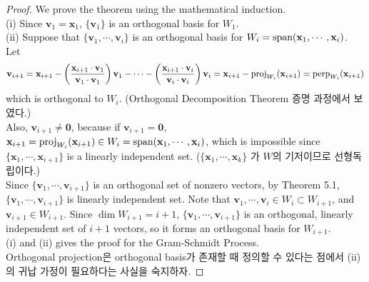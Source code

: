 \begin{proof}
	We prove the theorem using the mathematical induction. \\
	
	(i) Since $\textbf{v}_1 = \textbf{x}_1$, $\{\textbf{v}_1 \}$ is an orthogonal basis for $W_1$. \\
	
	(ii) Suppose that $\{\textbf{v}_1, \cdots, \textbf{v}_i \}$ is an orthogonal basis for $W_i = \textnormal{span}(\textbf{x}_1, \cdots, \textbf{x}_i)$.  Let \begin{equation*}
	\textbf{v}_{i+1} = \textbf{x}_{i+1} - \left (\frac{\textbf{x}_{i+1} \cdot \textbf{v}_1}{\textbf{v}_1 \cdot \textbf{v}_1} \right )\textbf{v}_1 - \cdots - \left (\frac{\textbf{x}_{i+1} \cdot \textbf{v}_i}{\textbf{v}_i \cdot \textbf{v}_i} \right)\textbf{v}_i = \textbf{x}_{i+1} - \textnormal{proj}_{W_i}(\textbf{x}_{i+1}) = \textnormal{perp}_{W_i}(\textbf{x}_{i+1})
	\end{equation*}
	which is orthogonal to $W_i$. {\color{blue}(Orthogonal Decomposition Theorem 증명 과정에서 보였다.)} \\
	Also, $\textbf{v}_{i+1} \neq \textbf{0}$, because if $\textbf{v}_{i+1} = \textbf{0}$, $\textbf{x}_{i+1} = \textnormal{proj}_{W_i}(\textbf{x}_{i+1}) \in W_i = \textnormal{span}(\textbf{x}_1, \cdots, \textbf{x}_i)$, which is impossible since $\{\textbf{x}_1, \cdots, \textbf{x}_{i+1} \}$ is a linearly independent set. {\color{blue}($\{\textbf{x}_1, \cdots, \textbf{x}_k \}$ 가 $W$의 기저이므로 선형독립이다.)} \\
	
	Since $\{\textbf{v}_1, \cdots, \textbf{v}_{i+1} \}$ is an orthogonal set of nonzero vectors, by Theorem 5.1, $\{\textbf{v}_1, \cdots, \textbf{v}_{i+1} \}$ is linearly independent set. Note that $\textbf{v}_1, \cdots, \textbf{v}_i \in W_i \subset W_{i+1}$, and $\textbf{v}_{i+1} \in W_{i+1}$. Since $\dim{W_{i+1}} = i+1$, $\{\textbf{v}_1, \cdots, \textbf{v}_{i+1} \}$ is an orthogonal, linearly independent set of $i+1$ vectors, so it forms an orthogonal basis for $W_{i+1}$. \\
	
	(i) and (ii) gives the proof for the Gram-Schmidt Process. \\
	
	{\color{blue}Orthogonal projection은 orthogonal basis가 존재할 때 정의할 수 있다는 점에서 (ii)의 귀납 가정이 필요하다는 사실을 숙지하자.}
\end{proof}

